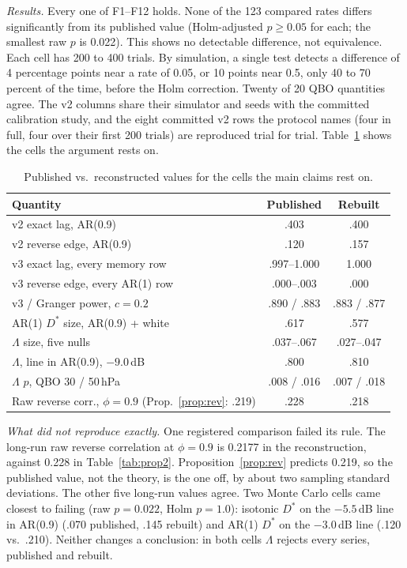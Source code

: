 \documentclass[10pt,twocolumn,letterpaper]{article}
\theoremstyle{definition}
\theoremstyle{remark}
\begin{document}
\textit{Results.} Every one of F1--F12 holds. None of the 123 compared rates
differs significantly from its published value (Holm-adjusted $p\ge0.05$ for
each; the smallest raw $p$ is 0.022). This shows no detectable difference, not
equivalence. Each cell has 200 to 400 trials. By simulation, a single test
detects a difference of 4 percentage points near a rate of 0.05, or 10 points
near 0.5, only 40 to 70 percent of the time, before the Holm correction. Twenty of 20 QBO quantities agree. The v2 columns
share their simulator and seeds with the committed calibration study, and the
eight committed v2 rows the protocol names (four in full, four over their first
200 trials) are reproduced trial for trial.
Table~\ref{tab:recon} shows the cells the argument rests on.

\begin{table}[t]
\centering\scriptsize
\caption{Published vs.\ reconstructed values for the cells the main claims rest on.}
\label{tab:recon}
\begin{tabular}{@{}lcc@{}}
\toprule
Quantity & Published & Rebuilt\\
\midrule
v2 exact lag, AR(0.9) & .403 & .400\\
v2 reverse edge, AR(0.9) & .120 & .157\\
v3 exact lag, every memory row & .997--1.000 & 1.000\\
v3 reverse edge, every AR(1) row & .000--.003 & .000\\
v3 / Granger power, $c=0.2$ & .890 / .883 & .883 / .877\\
AR(1) $D^*$ size, AR(0.9) + white & .617 & .577\\
$\Lambda$ size, five nulls & .037--.067 & .027--.047\\
$\Lambda$, line in AR(0.9), $-9.0$\,dB & .800 & .810\\
$\Lambda$ $p$, QBO 30 / 50\,hPa & .008 / .016 & .007 / .018\\
Raw reverse corr., $\phi=0.9$ (Prop.~\ref{prop:rev}: .219) & .228 & .218\\
\bottomrule
\end{tabular}
\end{table}

\textit{What did not reproduce exactly.} One registered comparison failed its
rule. The long-run raw reverse correlation at $\phi=0.9$ is 0.2177 in the
reconstruction, against 0.228 in Table~\ref{tab:prop2}. Proposition~\ref{prop:rev}
predicts 0.219, so the published value, not the theory, is the one off, by about
two sampling standard deviations. The other five long-run values agree. Two
Monte Carlo cells came closest to failing (raw $p=0.022$, Holm $p=1.0$): isotonic
$D^*$ on the $-5.5$\,dB line in AR(0.9) (.070 published, .145 rebuilt) and
AR(1) $D^*$ on the $-3.0$\,dB line (.120 vs.\ .210). Neither changes a
conclusion: in both cells $\Lambda$ rejects every series, published and rebuilt.
\end{document}

